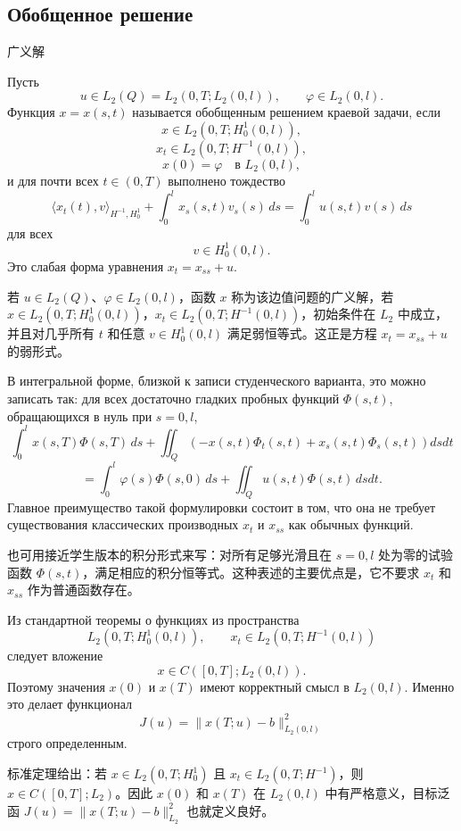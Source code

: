 \documentclass[12pt,a4paper]{article}
\newcommand{\zh}[1]{\par\noindent #1\par}
\begin{document}
\subsection*{Обобщенное решение}
\zh{广义解}
Пусть
\[
u\in L_2(Q)=L_2(0,T;L_2(0,l)),
\qquad
\varphi\in L_2(0,l).
\]
Функция \(x=x(s,t)\) называется обобщенным решением краевой задачи, если
\[
x\in L_2(0,T;H_0^1(0,l)),
\]
\[
x_t\in L_2(0,T;H^{-1}(0,l)),
\]
\[
x(0)=\varphi\quad \text{в }L_2(0,l),
\]
и для почти всех \(t\in(0,T)\) выполнено тождество
\[
\langle x_t(t),v\rangle_{H^{-1},H_0^1}
+
\int_0^l x_s(s,t)v_s(s)\,ds
=
\int_0^l u(s,t)v(s)\,ds
\]
для всех
\[
v\in H_0^1(0,l).
\]
Это слабая форма уравнения \(x_t=x_{ss}+u\).
\zh{若 \(u\in L_2(Q)\)、\(\varphi\in L_2(0,l)\)，函数 \(x\) 称为该边值问题的广义解，若 \(x\in L_2(0,T;H_0^1(0,l))\)，\(x_t\in L_2(0,T;H^{-1}(0,l))\)，初始条件在 \(L_2\) 中成立，并且对几乎所有 \(t\) 和任意 \(v\in H_0^1(0,l)\) 满足弱恒等式。这正是方程 \(x_t=x_{ss}+u\) 的弱形式。}


В интегральной форме, близкой к записи студенческого варианта, это можно записать так: для всех достаточно гладких пробных функций \(\Phi(s,t)\), обращающихся в нуль при \(s=0,l\),
\[
\int_0^l x(s,T)\Phi(s,T)\,ds
+
\iint_Q\left(-x(s,t)\Phi_t(s,t)+x_s(s,t)\Phi_s(s,t)\right)dsdt
\]
\[
=
\int_0^l \varphi(s)\Phi(s,0)\,ds
+
\iint_Q u(s,t)\Phi(s,t)\,dsdt.
\]
Главное преимущество такой формулировки состоит в том, что она не требует существования классических производных \(x_t\) и \(x_{ss}\) как обычных функций.
\zh{也可用接近学生版本的积分形式来写：对所有足够光滑且在 \(s=0,l\) 处为零的试验函数 \(\Phi(s,t)\)，满足相应的积分恒等式。这种表述的主要优点是，它不要求 \(x_t\) 和 \(x_{ss}\) 作为普通函数存在。}

Из стандартной теоремы о функциях из пространства
\[
L_2(0,T;H_0^1(0,l)),
\qquad
x_t\in L_2(0,T;H^{-1}(0,l))
\]
следует вложение
\[
x\in C([0,T];L_2(0,l)).
\]
Поэтому значения \(x(0)\) и \(x(T)\) имеют корректный смысл в \(L_2(0,l)\). Именно это делает функционал
\[
J(u)=\|x(T;u)-b\|_{L_2(0,l)}^2
\]
строго определенным.
\zh{标准定理给出：若 \(x\in L_2(0,T;H_0^1)\) 且 \(x_t\in L_2(0,T;H^{-1})\)，则 \(x\in C([0,T];L_2)\)。因此 \(x(0)\) 和 \(x(T)\) 在 \(L_2(0,l)\) 中有严格意义，目标泛函 \(J(u)=\|x(T;u)-b\|_{L_2}^2\) 也就定义良好。}
\end{document}
